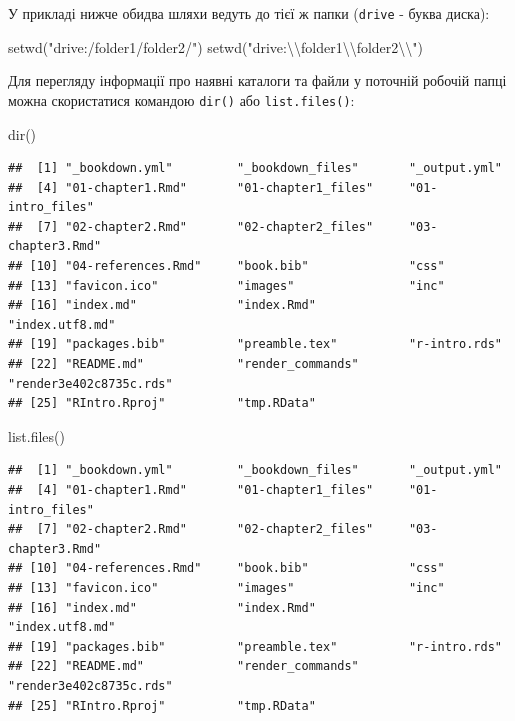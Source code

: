 \documentclass[
]{book}
\newenvironment{Shaded}{\begin{snugshade}}{\end{snugshade}}
\newcommand{\FunctionTok}[1]{\textcolor[rgb]{0.00,0.00,0.00}{#1}}
\newcommand{\NormalTok}[1]{#1}
\newcommand{\SpecialCharTok}[1]{\textcolor[rgb]{0.00,0.00,0.00}{#1}}
\newcommand{\StringTok}[1]{\textcolor[rgb]{0.31,0.60,0.02}{#1}}
\begin{document}
У прикладі нижче обидва шляхи ведуть до тієї ж папки (\texttt{drive} - буква диска):

\begin{Shaded}
\begin{Highlighting}[]
\FunctionTok{setwd}\NormalTok{(}\StringTok{"drive:/folder1/folder2/"}\NormalTok{)}
\FunctionTok{setwd}\NormalTok{(}\StringTok{"drive:}\SpecialCharTok{\textbackslash{}\textbackslash{}}\StringTok{folder1}\SpecialCharTok{\textbackslash{}\textbackslash{}}\StringTok{folder2}\SpecialCharTok{\textbackslash{}\textbackslash{}}\StringTok{"}\NormalTok{)}
\end{Highlighting}
\end{Shaded}

Для перегляду інформації про наявні каталоги та файли у поточній робочій папці можна скористатися командою \texttt{dir()} або \texttt{list.files()}:

\begin{Shaded}
\begin{Highlighting}[]
\FunctionTok{dir}\NormalTok{()}
\end{Highlighting}
\end{Shaded}

\begin{verbatim}
##  [1] "_bookdown.yml"         "_bookdown_files"       "_output.yml"          
##  [4] "01-chapter1.Rmd"       "01-chapter1_files"     "01-intro_files"       
##  [7] "02-chapter2.Rmd"       "02-chapter2_files"     "03-chapter3.Rmd"      
## [10] "04-references.Rmd"     "book.bib"              "css"                  
## [13] "favicon.ico"           "images"                "inc"                  
## [16] "index.md"              "index.Rmd"             "index.utf8.md"        
## [19] "packages.bib"          "preamble.tex"          "r-intro.rds"          
## [22] "README.md"             "render_commands"       "render3e402c8735c.rds"
## [25] "RIntro.Rproj"          "tmp.RData"
\end{verbatim}

\begin{Shaded}
\begin{Highlighting}[]
\FunctionTok{list.files}\NormalTok{()}
\end{Highlighting}
\end{Shaded}

\begin{verbatim}
##  [1] "_bookdown.yml"         "_bookdown_files"       "_output.yml"          
##  [4] "01-chapter1.Rmd"       "01-chapter1_files"     "01-intro_files"       
##  [7] "02-chapter2.Rmd"       "02-chapter2_files"     "03-chapter3.Rmd"      
## [10] "04-references.Rmd"     "book.bib"              "css"                  
## [13] "favicon.ico"           "images"                "inc"                  
## [16] "index.md"              "index.Rmd"             "index.utf8.md"        
## [19] "packages.bib"          "preamble.tex"          "r-intro.rds"          
## [22] "README.md"             "render_commands"       "render3e402c8735c.rds"
## [25] "RIntro.Rproj"          "tmp.RData"
\end{verbatim}
\end{document}
